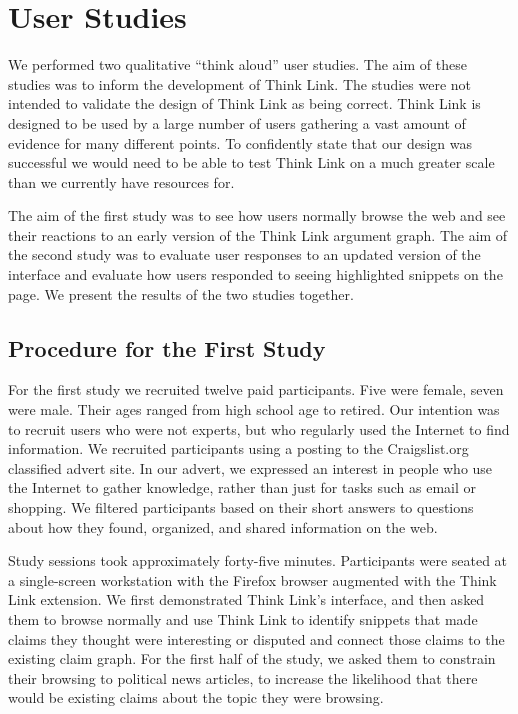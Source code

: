 \documentclass{chi2009}
\newcommand{\todo}[1]{}
\begin{document}
\section{User Studies}

We performed two qualitative ``think aloud'' user studies. The aim of these studies was to inform the development of Think Link. The studies were not intended to validate the design of Think Link as being correct. Think Link is designed to be used by a large number of users gathering a vast amount of evidence for many different points. To confidently state that our design was successful we would need to be able to test Think Link on a much greater scale than we currently have resources for. %

The aim of the first study was to see how users normally browse the web and see their reactions to an early version of the Think Link argument graph. The aim of the second study was to evaluate user responses to an updated version of the interface and evaluate how users responded to seeing highlighted snippets on the page. We present the results of the two studies together.

\subsection{Procedure for the First Study}

For the first study we recruited twelve paid participants.  %
Five were female, seven were male. Their ages ranged from high school age to retired. Our intention was to recruit users who were not experts, but who regularly used the Internet to find information. We recruited participants using a posting to the Craigslist.org classified advert site. In our advert, we expressed an interest in people who use the Internet to gather knowledge, rather than just for tasks such as email or shopping. We filtered participants based on their short answers to questions about how they found, organized, and shared information on the web. 

\todo{This was a bad recruiting strategy. We should have recruited people that fitted one of our two personas and then set them tasks that fitted our vision for that persona.}

Study sessions took approximately forty-five minutes.  %
Participants were seated at a single-screen workstation with the Firefox browser augmented with the Think Link extension. We first demonstrated Think Link's interface, and then asked them to browse normally and use Think Link to identify snippets that made claims they thought were interesting or disputed and connect those claims to the existing claim graph. For the first half of the study, we asked them to constrain their browsing to political news articles, to increase the likelihood that there would be existing claims about the topic they were browsing.
\end{document}
